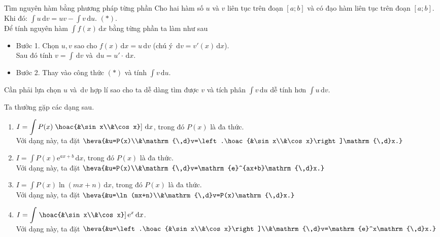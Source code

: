\begin{dang}{Tìm nguyên hàm bằng phương pháp từng phần}
	Cho hai hàm số $u$ và $v$ liên tục trên đoạn $[a;b]$ và có đạo hàm liên tục trên đoạn $[a;b]$.\\
	Khi đó: $\displaystyle\int u\mathrm{\,d}v=uv-\displaystyle\int v\mathrm{\,d}u$. $(*)$.\\
	Để tính nguyên hàm $\displaystyle\int f(x)\mathrm{\,d}x$ bằng từng phần ta làm như sau
	\begin{itemize}
	\item Bước 1. Chọn $u, v$ sao cho $f(x)\mathrm{\,d}x=u\mathrm{\,d}v$ (chú ý $\mathrm{\,d}v=v'(x)\mathrm{\,d}x$).\\
	Sau đó tính $v=\displaystyle\int\mathrm{\,d}v$ và $\mathrm{\,d}u=u'\cdot\mathrm{\,d}x$.
	\item Bước 2. Thay vào công thức $(*)$ và tính $\displaystyle\int v\mathrm{\,d}u$.
	\end{itemize}
\begin{note}
Cần phải lựa chọn $u$ và $\mathrm{\,d}v$ hợp lí sao cho ta dễ dàng tìm được $v$ và tích phân $\displaystyle\int v\mathrm{\,d}u$ dễ tính hơn $\displaystyle\int u\mathrm{\,d}v$.	
\end{note}
Ta thường gặp các dạng sau.
\begin{enumerate}[Dạng 1.]
	\item $I=\displaystyle\int P(x)\left.\hoac{&\sin x\\&\cos x}\right]\mathrm{\,d}x$, trong đó $P(x)$ là đa thức.\\
	Với dạng này, ta đặt $\heva{&u=P(x)\\&\mathrm{\,d}v=\left.\hoac{&\sin x\\&\cos x}\right]\mathrm{\,d}x.}$
	\item $I=\displaystyle\int P(x)\mathrm{e}^{ax+b}\mathrm{\,d}x$, trong đó $P(x)$ là đa thức.\\
	Với dạng này, ta đặt $\heva{&u=P(x)\\&\mathrm{\,d}v=\mathrm{e}^{ax+b}\mathrm{\,d}x.}$
	\item $I=\displaystyle\int P(x)\ln(mx+n)\mathrm{\,d}x$, trong đó $P(x)$ là đa thức.\\
	Với dạng này, ta đặt $\heva{&u=\ln(mx+n)\\&\mathrm{\,d}v=P(x)\mathrm{\,d}x.}$
	\item $I=\displaystyle\int\left.\hoac{&\sin x\\&\cos x}\right]\mathrm{e}^x\mathrm{\,d}x$.\\
	Với dạng này, ta đặt $\heva{&u=\left.\hoac{&\sin x\\&\cos x}\right]\\&\mathrm{\,d}v=\mathrm{e}^x\mathrm{\,d}x.}$
\end{enumerate}
\end{dang}
